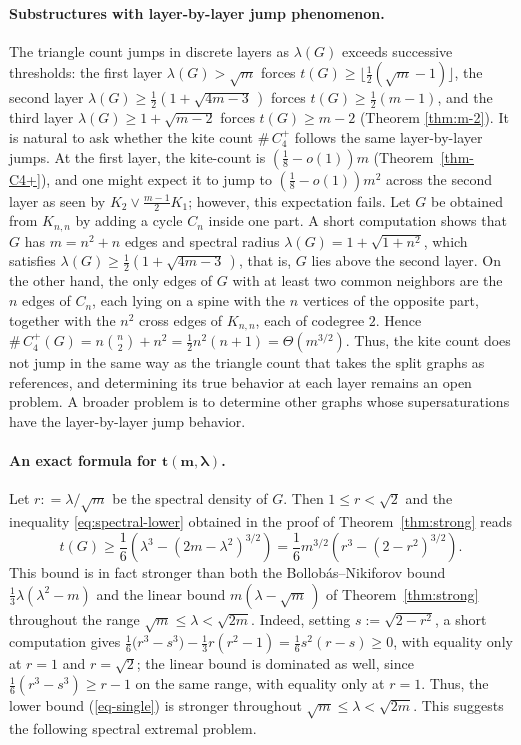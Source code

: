 \documentclass[11pt,a4paper]{article}
\theoremstyle{definition}
\theoremstyle{plain}
\renewcommand{\le}{\leqslant}
\renewcommand{\ge}{\geqslant}
\begin{document}
\paragraph{Substructures with layer-by-layer jump phenomenon.}
The triangle count jumps in discrete layers 
as $\lambda(G)$ exceeds successive
thresholds: the first layer $\lambda (G)>\sqrt m$ forces $t(G)\ge 
\lfloor \frac{1}{2}(\sqrt{m} -1) \rfloor$,
the second layer $\lambda (G) \ge \tfrac{1}{2}(1+\sqrt{4m-3}\,)$ forces
$t(G)\ge\tfrac{1}{2}(m-1)$, and the third layer $\lambda (G)\ge 1+ \sqrt{m-2}$  forces $t(G)\ge m-2$ (Theorem \ref{thm:m-2}). 
It is natural to ask whether the kite count
$\texttt{\#}\,C_4^+$ follows the same layer-by-layer jumps. At the first layer, 
the kite-count is $ (\frac{1}{8} - o(1))m$ (Theorem~\ref{thm-C4+}), and one might expect it to jump to 
$(\frac{1}{8} - o(1))m^2$ across the second layer as seen by $K_2\vee \frac{m-1}{2}K_1$; however, this expectation fails. Let 
$G$ be obtained from $K_{n,n}$ by adding a cycle $C_n$ inside one part. A short computation shows that $G$
has $m=n^2+n$ edges and spectral radius $\lambda(G)=1+\sqrt{1+n^2}$, which satisfies 
$\lambda(G)\ge \frac{1}{2}(1+ \sqrt{4m-3}\,)$, that is, $G$ lies above the second layer. On the other hand, the
only edges of $G$ with at least two common neighbors are the $n$  edges of $C_n$, each lying on
a spine with the $n$ vertices of the opposite part, 
together with the $n^2$ cross edges of $K_{n,n}$,
each of codegree $2$. Hence $\texttt{\#}\,C_4^+(G)=n\binom{n}{2}+n^2=\tfrac12 n^2(n+1)
=\Theta(m^{3/2})$.  
Thus, the kite count does not jump in the same way as the triangle count that takes the split graphs as references,
and determining its true behavior at each layer remains an open problem. 
A broader problem is to determine other graphs whose supersaturations have the layer-by-layer jump behavior. 

\paragraph{An exact formula for $\bm{t(m,\lambda)}$.}
Let $r: = \lambda /\sqrt m$ be the spectral density of $G$. Then $1\le r<\sqrt2$ and the inequality \eqref{eq:spectral-lower} obtained
in the proof of Theorem~\ref{thm:strong} reads
\begin{equation} \label{eq-single}
   t(G)\ge \frac16 \left(\lambda^3-(2m-\lambda^2)^{3/2}
   \right)= \frac16 m^{3/2}\left(r^3-(2-r^2)^{3/2}\right).
\end{equation}
This bound is in fact stronger than both the
Bollob\'as--Nikiforov bound
$\tfrac13\lambda(\lambda^2-m)$ and the linear bound
$m(\lambda-\sqrt m\,)$ of Theorem~\ref{thm:strong}
throughout the range $\sqrt m\le\lambda<\sqrt{2m}$.
Indeed, setting $s:=\sqrt{2-r^2}$, a short computation gives
$ \tfrac16\bigl(r^3-s^3\bigr)
   -\tfrac13 r(r^2-1)=\tfrac16 s^2(r-s)\ge 0$, 
with equality only at $r=1$ and $r=\sqrt2$; 
the linear bound is dominated as well, since $\tfrac16(r^3-s^3)\ge r-1$ on the same range, 
with equality only at $r=1$. 
Thus, the lower
bound (\ref{eq-single}) 
is stronger throughout $\sqrt{m}\le \lambda < \sqrt{2m}$. This suggests the following spectral extremal problem.
\end{document}
